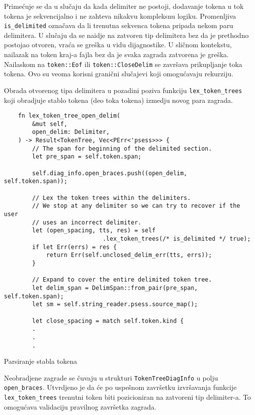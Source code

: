 Primećuje se da u slučaju da kada delimiter ne postoji, dodavanje tokena u tok tokena 
je sekvencijalno i ne zahteva nikakvu kompleksnu logiku. Promenljiva \verb|is_delimited|
označava da li trenutna sekvenca tokena pripada nekom paru delimitera. U slučaju da 
se naidje na zatvoren tip delimitera bez da je prethodno postojao otvoren, vraća se greška
u vidu dijagnostike. U sličnom kontekstu, nailazak na token kraj-a fajla bez da je svaka 
zagrada zatvorena je greška. 
Nailaskom na \verb|token::Eof| ili \verb|token::CloseDelim| se završava prikupljanje toka tokena.
Ovo su veoma korisni granični slučajevi koji omogućavaju rekurziju. 

Obrada otvorenog tipa delimitera u pozadini poziva funkciju \verb|lex_token_trees| koji obradjuje
stablo tokena (deo toka tokena) izmedju novog para zagrada.
\begin{listing}[H]
\begin{verbatim}
    fn lex_token_tree_open_delim(
        &mut self,
        open_delim: Delimiter,
    ) -> Result<TokenTree, Vec<PErr<'psess>>> {
        // The span for beginning of the delimited section.
        let pre_span = self.token.span;

        self.diag_info.open_braces.push((open_delim, self.token.span));

        // Lex the token trees within the delimiters.
        // We stop at any delimiter so we can try to recover if the user
        // uses an incorrect delimiter.
        let (open_spacing, tts, res) = self
                            .lex_token_trees(/* is_delimited */ true);
        if let Err(errs) = res {
            return Err(self.unclosed_delim_err(tts, errs));
        }

        // Expand to cover the entire delimited token tree.
        let delim_span = DelimSpan::from_pair(pre_span, self.token.span);
        let sm = self.string_reader.psess.source_map();

        let close_spacing = match self.token.kind {
        .
        .
        .
\end{verbatim}
\caption{Parsiranje stabla tokena}
\end{listing}

Neobradjene zagrade se čuvaju u strukturi \verb|TokenTreeDiagInfo| u polju \verb|open_braces|.
Utvrdjeno je da će po uspešnom završetku izvršavanja funkcije \verb|lex_token_trees| 
trenutni token biti pozicioniran na zatvoreni tip delimiter-a. To omogućava validaciju 
pravilnog završetka zagrada.